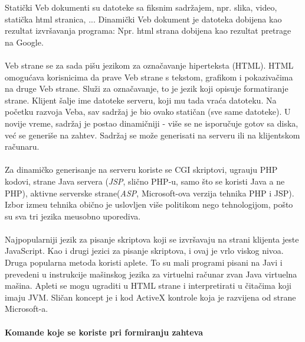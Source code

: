 \documentclass{article} %
\begin{document}
\noindent Stati\v cki Veb dokumenti su datoteke sa fiksnim sadr\v zajem, npr. slika, video, stati\v cka html stranica, ... Dinami\v cki Veb dokument je datoteka dobijena kao rezultat izvr\v savanja programa: Npr. html strana dobijena kao rezultat pretrage na Google.
\\
\\ Veb strane se za sada pi\v su jezikom za ozna\v cavanje hiperteksta (HTML). HTML omogu\' cava korisnicima da prave Veb strane s tekstom, grafikom i pokaziva\v cima na druge Veb strane. Slu\v zi za ozna\v cavanje, to je jezik koji opisuje formatiranje strane. Klijent \v salje ime datoteke serveru, koji mu tada vra\' ca datoteku. Na po\v cetku razvoja Veba, sav sadr\v zaj je bio ovako stati\v can (sve same datoteke). U novije vreme, sadr\v zaj je postao dinami\v cniji - vi\v se se ne isporu\v cuje gotov sa diska, ve\' c se generi\v se na zahtev. Sadr\v zaj se mo\v ze generisati na serveru ili na klijentskom ra\v cunaru. 
\\
\\ Za dinami\v cko generisanje na serveru koriste se CGI skriptovi, ugra\dj uju PHP kodovi, strane Java servera (\textit{JSP}, sli\v cno PHP-u, samo \v sto se koristi Java a ne PHP), aktivne serverske strane(\textit{ASP}, Microsoft-ova verzija tehnika PHP i JSP). Izbor izme\dj u tehnika obi\v cno je uslovljen vi\v se politikom nego tehnologijom, po\v sto su sva tri jezika me\dj usobno uporediva. 
\\
\\ Najpopularniji jezik za pisanje skriptova koji se izvr\v savaju na strani klijenta jeste JavaScript. Kao i drugi jezici za pisanje skriptova, i ovaj je vrlo viskog nivoa. Druga popularna metoda koristi aplete. To su mali programi pisani na Javi i prevedeni u instrukcije ma\v sinskog jezika za virtuelni ra\v cunar zvan Java virtuelna ma\v sina. Apleti se mogu ugraditi u HTML strane i interpretirati u \v cita\v cima koji imaju JVM. Sli\v can koncept je i kod ActiveX kontrole koja je razvijena od strane Microsoft-a.
\\
\\
\noindent\textbf{Komande koje se koriste pri formiranju zahteva}
\end{document}

